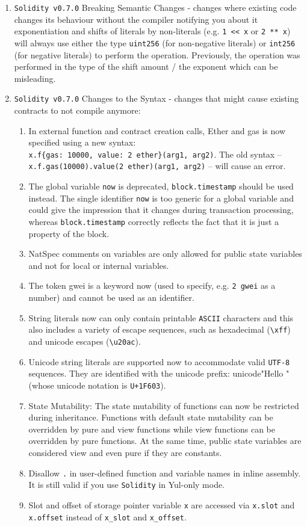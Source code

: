 \begin{enumerate}
\item \verb|Solidity v0.7.0| Breaking Semantic Changes - changes where existing code changes its behaviour without the compiler notifying you about it  exponentiation and shifts of literals by non-literals (e.g. \verb|1 << x| or \verb|2 ** x|) will always use either the type \verb|uint256| (for non-negative literals) or \verb|int256| (for negative literals) to perform the operation. Previously, the operation was performed in the type of the shift amount / the exponent which can be misleading.

\item \verb|Solidity v0.7.0| Changes to the Syntax - changes that might cause existing contracts to not compile anymore:
    \begin{enumerate}
	\item In external function and contract creation calls, Ether and gas is now specified using a new syntax:\\\verb|x.f{gas: 10000, value: 2 ether}(arg1, arg2)|. The old syntax – \verb|x.f.gas(10000).value(2 ether)(arg1, arg2)| – will cause an error.
	\item The global variable \verb|now| is deprecated, \verb|block.timestamp| should be used instead. The single identifier \verb|now| is too generic for a global variable and could give the impression that it changes during transaction processing, whereas \verb|block.timestamp| correctly reflects the fact that it is just a property of the block.
	\item NatSpec comments on variables are only allowed for public state variables and not for local or internal variables.
	\item The token gwei is a keyword now (used to specify, e.g. \verb|2 gwei| as a number) and cannot be used as an identifier.
	\item String literals now can only contain printable \verb|ASCII| characters and this also includes a variety of escape sequences, such as hexadecimal (\verb|\xff|) and unicode escapes (\verb|\u20ac|).
	\item Unicode string literals are supported now to accommodate valid \verb|UTF-8| sequences. They are identified with the unicode prefix: unicode"Hello \smiley" (whose unicode notation is \verb|U+1F603|).
	\item State Mutability: The state mutability of functions can now be restricted during inheritance. Functions with default state mutability can be overridden by pure and view functions while view functions can be overridden by pure functions. At the same time, public state variables are considered view and even pure if they are constants.
	\item Disallow \verb|.| in user-defined function and variable names in inline assembly. It is still valid if you use \verb|Solidity| in Yul-only mode.
	\item Slot and offset of storage pointer variable \verb|x| are accessed via \verb|x.slot| and \verb|x.offset| instead of \verb|x_slot| and \verb|x_offset|.
    \end{enumerate}


\end{enumerate}
